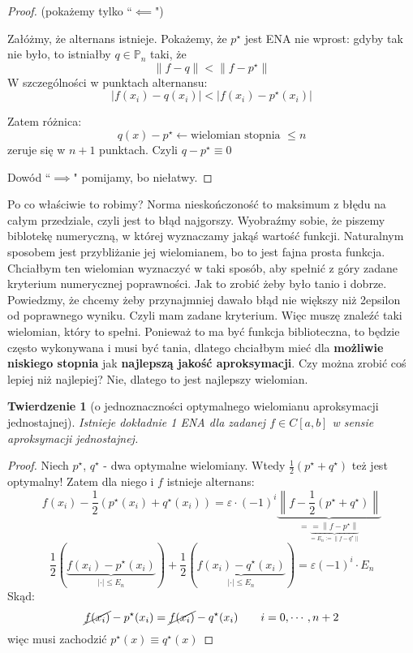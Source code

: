 \documentclass[hidelinks,a4paper,fleqn,oneside]{book}
\newcommand{\norm}[1]{\left\lVert#1\right\rVert}
\newtheorem{twierdz}{Twierdzenie}
\begin{document}
\begin{proof}(pokażemy tylko ``$\impliedby$")

Załóżmy, że alternans istnieje. Pokażemy, że $p^\star$ jest ENA nie wprost: gdyby tak nie było, to istniałby $q \in \mathbb{P}_n$ taki, że
\[
	\norm{f-q} < \norm{f - p^\star}
\]
W szczególności w punktach alternansu:
\[
	|f(x_i) - q(x_i)| < |f(x_i) - p^\star(x_i)|
\]
\begin{tikzpicture}
\end{tikzpicture}

Zatem różnica:
\[
	q(x) - p^\star \leftarrow \textrm{wielomian stopnia }\leq n
\]
zeruje się w $n+1$ punktach. Czyli $q-p^\star \equiv 0$

Dowód ``$\implies$" pomijamy, bo niełatwy.
\end{proof}
Po co właściwie to robimy? Norma nieskończoność to maksimum z błędu na całym przedziale, czyli jest to błąd najgorszy. Wyobraźmy sobie, że piszemy biblotekę numeryczną, w której wyznaczamy jakąś wartość funkcji. Naturalnym sposobem jest przybliżanie jej wielomianem, bo to jest fajna prosta funkcja. Chciałbym ten wielomian wyznaczyć w taki sposób, aby spełnić z góry zadane kryterium numerycznej poprawności. Jak to zrobić żeby było tanio i dobrze. Powiedzmy, że chcemy żeby przynajmniej dawało błąd nie większy niż 2epsilon od poprawnego wyniku. Czyli mam zadane kryterium. Więc muszę znaleźć taki wielomian, który to spełni. Ponieważ to ma być funkcja biblioteczna, to będzie często wykonywana i musi być tania, dlatego chciałbym mieć dla \textbf{możliwie niskiego stopnia} jak \textbf{najlepszą jakość aproksymacji}. Czy można zrobić coś lepiej niż najlepiej? Nie, dlatego to jest najlepszy wielomian.

\begin{twierdz}[o jednoznaczności optymalnego wielomianu aproksymacji jednostajnej]
Istnieje dokładnie 1 ENA dla zadanej $f \in C[a, b]$ w sensie aproksymacji jednostajnej.
\end{twierdz}
\begin{proof}
Niech $p^\star$, $q^\star$ - dwa optymalne wielomiany. Wtedy $\frac{1}{2}(p^\star + q^\star)$ też jest optymalny! Zatem dla niego i $f$ istnieje alternans:
\[
	f(x_i) - \frac{1}{2}(p^\star(x_i) + q^\star(x_i)) = \varepsilon\cdot(-1)^i\underbrace{\norm{f-\frac{1}{2}(p^\star + q^\star)}}_{=\underbrace{=\norm{f-p^\star}}_{=E_n := \norm{f - q^\star}}}
\]
\[
	\frac{1}{2}(\underbrace{f(x_i) - p^\star(x_i)}_{|\cdot| \leq E_n}) + \frac{1}{2}(\underbrace{f(x_i) - q^\star(x_i)}_{|\cdot| \leq E_n}) = \varepsilon(-1)^i\cdot E_n
\]
Skąd:
\[
	\cancel{f(x_i)} - p^\star(x_i) = \cancel{f(x_i)} - q^\star(x_i) \quad \quad i = 0, \cdots, n+2
\]
więc musi zachodzić $p^\star(x) \equiv q^\star(x)$
\end{proof}
\end{document}
